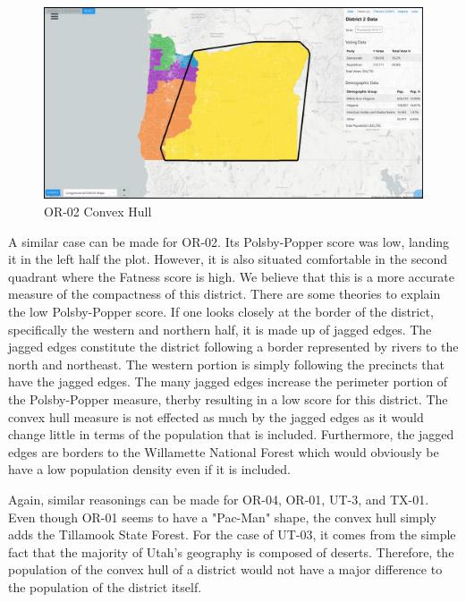 \documentclass[letterpaper]{article}
\begin{document}
\begin{figure}[H]
	\includegraphics[width=\linewidth]{./figures/OR-02-ConvexHull.png}
	\caption{OR-02 Convex Hull}
	\label{fig:or02convexHull}
\end{figure}

A similar case can be made for OR-02. Its Polsby-Popper score was low, landing it in the left half the plot. However, it is also situated comfortable in the second quadrant where the Fatness score is high. We believe that this is a more accurate measure of the compactness of this district. There are some theories to explain the low Polsby-Popper score. If one looks closely at the border of the district, specifically the western and northern half, it is made up of jagged edges. The jagged edges constitute the district following a border represented by rivers to the north and northeast. The western portion is simply following the precincts that have the jagged edges. The many jagged edges increase the perimeter portion of the Polsby-Popper measure, therby resulting in a low score for this district. The convex hull measure is not effected as much by the jagged edges as it would change little in terms of the population that is included. Furthermore, the jagged edges are borders to the Willamette National Forest which would obviously be have a low population density even if it is included.

Again, similar reasonings can be made for OR-04, OR-01, UT-3, and TX-01. Even though OR-01 seems to have a "Pac-Man" shape, the convex hull simply adds the Tillamook State Forest. For the case of UT-03, it comes from the simple fact that the majority of Utah's geography is composed of deserts. Therefore, the population of the convex hull of a district would not have a major difference to the population of the district itself.
\end{document}

